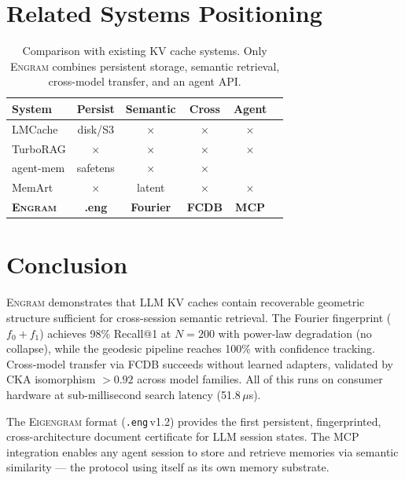 \documentclass[11pt,twocolumn]{article}
\newcommand{\cmark}{\textcolor{green!60!black}{\checkmark}}
\newcommand{\xmark}{\textcolor{red!70!black}{$\times$}}
\newcommand{\engram}{\textsc{Engram}}
\newcommand{\eigengram}{\textsc{Eigengram}}
\newcommand{\fcdb}{\textsc{FCDB}}
\begin{document}
\section{Related Systems Positioning}
\label{sec:positioning}

\begin{table}[t]
\centering
\caption{Comparison with existing KV cache systems. Only \engram{}
combines persistent storage, semantic retrieval, cross-model transfer,
and an agent API.}
\label{tab:systems}
\small
\begin{tabular}{lccccc}
\toprule
System & Persist & Semantic & Cross & Agent \\
\midrule
LMCache & disk/S3 & \xmark & \xmark & \xmark \\
TurboRAG & \xmark & \xmark & \xmark & \xmark \\
agent-mem & safetens & \xmark & \xmark & \cmark \\
MemArt & \xmark & latent & \xmark & \xmark \\
\rowcolor{green!10}
\textbf{\engram{}} & \textbf{.eng} & \textbf{Fourier} & \textbf{\fcdb{}} & \textbf{MCP} \\
\bottomrule
\end{tabular}
\end{table}

\section{Conclusion}
\label{sec:conclusion}

\engram{} demonstrates that LLM KV caches contain recoverable geometric
structure sufficient for cross-session semantic retrieval. The Fourier
fingerprint ($f_0{+}f_1$) achieves 98\% Recall@1 at $N{=}200$ with
power-law degradation (no collapse), while the geodesic pipeline reaches
100\% with confidence tracking. Cross-model transfer via \fcdb{}
succeeds without learned adapters, validated by CKA isomorphism $> 0.92$
across model families. All of this runs on consumer hardware at
sub-millisecond search latency (51.8\,$\mu$s).

The \eigengram{} format (\texttt{.eng}\,v1.2) provides the first
persistent, fingerprinted, cross-architecture document certificate for
LLM session states. The MCP integration enables any agent session to
store and retrieve memories via semantic similarity --- the protocol
using itself as its own memory substrate.
\end{document}
